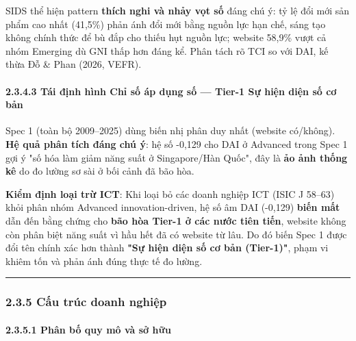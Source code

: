 \documentclass[12pt,a4paper]{article}
\begin{document}
SIDS thể hiện pattern \textbf{thích nghi và nhảy vọt số} đáng chú ý: tỷ
lệ đổi mới sản phẩm cao nhất (41,5\%) phản ánh đổi mới bằng nguồn lực
hạn chế, sáng tạo không chính thức để bù đắp cho thiếu hụt nguồn lực;
website 58,9\% vượt cả nhóm Emerging dù GNI thấp hơn đáng kể. Phân tách
rõ TCI so với DAI, kế thừa Đỗ \& Phan (2026, VEFR).

\hypertarget{2343-tuxe1i-ux111ux1ecbnh-huxecnh-chux1ec9-sux1ed1-uxe1p-dux1ee5ng-sux1ed1--tier-1-sux1ef1-hiux1ec7n-diux1ec7n-sux1ed1-cux1a1-bux1ea3n}{%
\paragraph{2.3.4.3 Tái định hình Chỉ số áp dụng số --- Tier-1 Sự hiện
diện số cơ
bản}\label{2343-tuxe1i-ux111ux1ecbnh-huxecnh-chux1ec9-sux1ed1-uxe1p-dux1ee5ng-sux1ed1--tier-1-sux1ef1-hiux1ec7n-diux1ec7n-sux1ed1-cux1a1-bux1ea3n}}

Spec 1 (toàn bộ 2009--2025) dùng biến nhị phân duy nhất (website
có/không). \textbf{Hệ quả phân tích đáng chú ý}: hệ số -0,129 cho DAI ở
Advanced trong Spec 1 gợi ý "số hóa làm giảm năng suất ở Singapore/Hàn
Quốc", đây là \textbf{ảo ảnh thống kê} do đo lường sơ sài ở bối cảnh đã
bão hòa.

\textbf{Kiểm định loại trừ ICT}: Khi loại bỏ các doanh nghiệp ICT (ISIC
J 58--63) khỏi phân nhóm Advanced innovation-driven, hệ số âm DAI
(-0,129) \textbf{biến mất} dẫn đến bằng chứng cho \textbf{bão hòa Tier-1
ở các nước tiên tiến}, website không còn phân biệt năng suất vì hầu hết
đã có website từ lâu. Do đó biến Spec 1 được đổi tên chính xác hơn thành
\textbf{"Sự hiện diện số cơ bản (Tier-1)"}, phạm vi khiêm tốn và phản
ánh đúng thực tế đo lường.

\begin{center}\rule{0.5\linewidth}{0.5pt}\end{center}

\hypertarget{235-cux1ea5u-truxfac-doanh-nghiux1ec7p}{%
\subsubsection{2.3.5 Cấu trúc doanh
nghiệp}\label{235-cux1ea5u-truxfac-doanh-nghiux1ec7p}}

\hypertarget{2351-phuxe2n-bux1ed1-quy-muxf4-vuxe0-sux1edf-hux1eefu}{%
\paragraph{2.3.5.1 Phân bố quy mô và sở
hữu}\label{2351-phuxe2n-bux1ed1-quy-muxf4-vuxe0-sux1edf-hux1eefu}}
\end{document}
